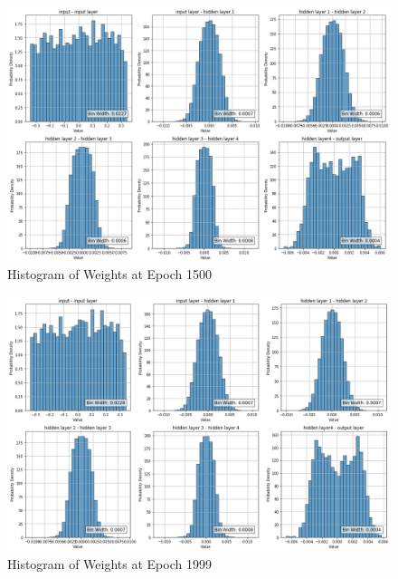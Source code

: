 \documentclass{ioereport}
\begin{document}
    \begin{figure}[H]
        \centering
        \includegraphics[width=\linewidth]{assets/video histogram/epoch1500Weight.png}
        \caption{Histogram of Weights at Epoch 1500}
        \label{fig:video-weight-1500}
    \end{figure}

    \begin{figure}[H]
        \centering
        \includegraphics[width=\linewidth]{assets/video histogram/epoch1999Weight.png}
        \caption{Histogram of Weights at Epoch 1999}
        \label{fig:video-weight-1999}
    \end{figure}
\end{document}
